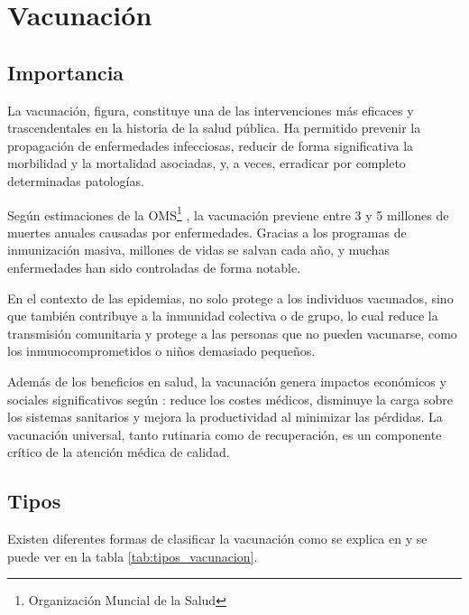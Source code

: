 \section{Vacunación}
\subsection{Importancia}
La vacunación, figura, constituye una de las intervenciones más eficaces y trascendentales en la historia de la salud pública. Ha permitido prevenir la propagación de enfermedades infecciosas, reducir de forma significativa la morbilidad y la mortalidad asociadas, y, a veces, erradicar por completo determinadas patologías.


Según estimaciones de la OMS\footnote{Organización Muncial de la Salud} \cite{oms_vacunas}, la vacunación previene entre 3 y 5 millones de muertes anuales causadas por enfermedades. Gracias a los programas de inmunización masiva, millones de vidas se salvan cada año, y muchas enfermedades han sido controladas de forma notable.

En el contexto de las epidemias, no solo protege a los individuos vacunados, sino que también contribuye a la inmunidad colectiva o de grupo, lo cual reduce la transmisión comunitaria y protege a las personas que no pueden vacunarse, como los inmunocomprometidos o niños demasiado pequeños.

Además de los beneficios en salud, la vacunación genera impactos económicos y sociales significativos según \cite{nandi2020vaccines}: reduce los costes médicos, disminuye la carga sobre los sistemas sanitarios y mejora la productividad al minimizar las pérdidas. La vacunación universal, tanto rutinaria como de recuperación, es un componente crítico de la atención médica de calidad.


\subsection{Tipos}
Existen diferentes formas de clasificar la vacunación como se explica en \cite{hhs_vaccines} y se puede ver en la tabla \ref{tab:tipos_vacunacion}.

